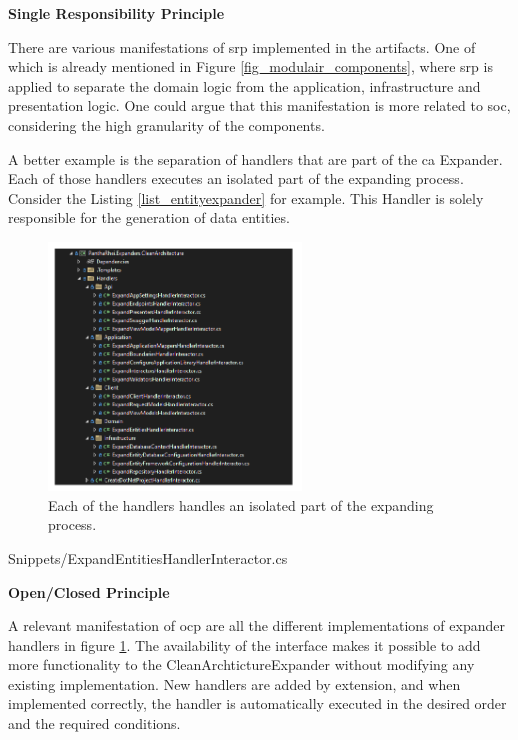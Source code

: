 \textbf{Single Responsibility Principle}

There are various manifestations of \gls{srp} implemented in the artifacts. One of which is
already mentioned in Figure \ref{fig_modulair_components}, where \gls{srp} is applied to
separate the domain logic from the application, infrastructure and presentation logic. One
could argue that this manifestation is more related to \gls{soc}, considering the high
granularity of the components.

A better example is the separation of handlers that are part of the \gls{ca}
Expander. Each of those handlers executes an isolated part of the expanding process.
Consider the Listing \ref{list_entityexpander} 
\parencite{koks_expandentitieshandlerinteractor_2023} for example. This Handler is solely
responsible for the generation of data entities. 

\begin{figure}[H]
    \centering
    \includegraphics[width=0.6\textwidth]{figures/expander_handlers.pdf}
    \caption[handlers]{Each of the handlers handles an isolated part of the expanding process.}
    \label{fig_handlers}
\end{figure}


    {Snippets/ExpandEntitiesHandlerInteractor.cs}

    \textbf{Open/Closed Principle}
    
A relevant manifestation of \gls{ocp} are all the different implementations of expander
handlers in figure \ref{fig_handlers}. The availability of the
 interface makes it possible to add more
functionality to the CleanArchtictureExpander without modifying any existing
implementation. New handlers are added by extension, and when implemented correctly, the
handler is automatically executed in the desired order and the required conditions.

